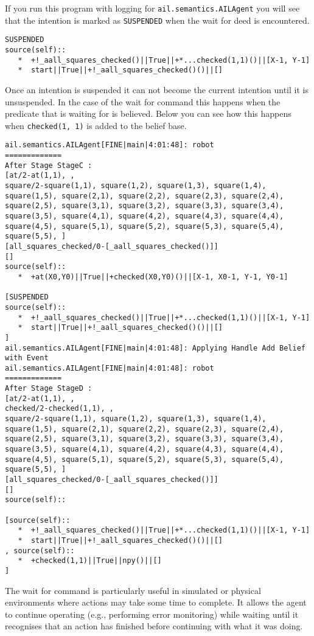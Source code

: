 \documentclass[a4]{article}
\begin{document}
If you run this program with logging for \texttt{ail.semantics.AILAgent} you will see that the intention is marked as \texttt{SUSPENDED} when the wait for deed is encountered.
\begin{verbatim}
SUSPENDED
source(self):: 
   *  +!_aall_squares_checked()||True||+*...checked(1,1)()||[X-1, Y-1]
   *  start||True||+!_aall_squares_checked()()||[]
\end{verbatim}
Once an intention is suspended it can not become the current intention until it is unsuspended.  In the case of the wait for command this happens when the predicate that is waiting for is believed.  Below you can see how this happens when \texttt{checked(1, 1)} is added to the belief base.

\begin{verbatim}
ail.semantics.AILAgent[FINE|main|4:01:48]: robot
=============
After Stage StageC :
[at/2-at(1,1), , 
square/2-square(1,1), square(1,2), square(1,3), square(1,4), square(1,5), square(2,1), square(2,2), square(2,3), square(2,4), square(2,5), square(3,1), square(3,2), square(3,3), square(3,4), square(3,5), square(4,1), square(4,2), square(4,3), square(4,4), square(4,5), square(5,1), square(5,2), square(5,3), square(5,4), square(5,5), ]
[all_squares_checked/0-[_aall_squares_checked()]]
[]
source(self):: 
   *  +at(X0,Y0)||True||+checked(X0,Y0)()||[X-1, X0-1, Y-1, Y0-1]

[SUSPENDED
source(self):: 
   *  +!_aall_squares_checked()||True||+*...checked(1,1)()||[X-1, Y-1]
   *  start||True||+!_aall_squares_checked()()||[]
] 
ail.semantics.AILAgent[FINE|main|4:01:48]: Applying Handle Add Belief with Event 
ail.semantics.AILAgent[FINE|main|4:01:48]: robot
=============
After Stage StageD :
[at/2-at(1,1), , 
checked/2-checked(1,1), , 
square/2-square(1,1), square(1,2), square(1,3), square(1,4), square(1,5), square(2,1), square(2,2), square(2,3), square(2,4), square(2,5), square(3,1), square(3,2), square(3,3), square(3,4), square(3,5), square(4,1), square(4,2), square(4,3), square(4,4), square(4,5), square(5,1), square(5,2), square(5,3), square(5,4), square(5,5), ]
[all_squares_checked/0-[_aall_squares_checked()]]
[]
source(self):: 

[source(self):: 
   *  +!_aall_squares_checked()||True||+*...checked(1,1)()||[X-1, Y-1]
   *  start||True||+!_aall_squares_checked()()||[]
, source(self):: 
   *  +checked(1,1)||True||npy()||[]
] 
\end{verbatim}

The wait for command is particularly useful in simulated or physical environments where actions may take some time to complete.  It allows the agent to continue operating (e.g., performing error monitoring) while waiting until it recognises that an action has finished before continuing with what it was doing.
\end{document}
